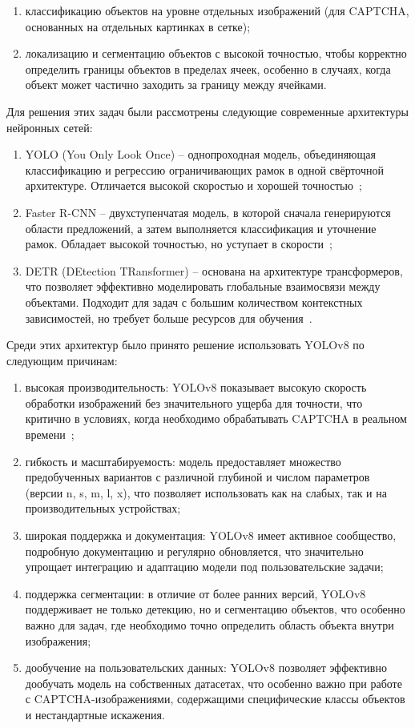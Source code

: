 \begin{enumerate}
    \item классификацию объектов на уровне отдельных изображений (для CAPTCHA, основанных на отдельных картинках в сетке);
    \item локализацию и сегментацию объектов с высокой точностью, чтобы корректно определить границы объектов в пределах ячеек, особенно в случаях, когда объект может частично заходить за границу между ячейками.
\end{enumerate}

Для решения этих задач были рассмотрены следующие современные архитектуры нейронных сетей:

\begin{enumerate}
    \item YOLO (You Only Look Once) -- однопроходная модель, объединяющая классификацию и регрессию ограничивающих рамок в одной свёрточной архитектуре. Отличается высокой скоростью и хорошей точностью~\cite{redmon2016yolov2, UltralyticsYOLOv8};
    \item Faster R-CNN -- двухступенчатая модель, в которой сначала генерируются области предложений, а затем выполняется классификация и уточнение рамок. Обладает высокой точностью, но уступает в скорости~\cite{ren2015fasterrcnn};
    \item DETR (DEtection TRansformer) -- основана на архитектуре трансформеров, что позволяет эффективно моделировать глобальные взаимосвязи между объектами. Подходит для задач с большим количеством контекстных зависимостей, но требует больше ресурсов для обучения~\cite{carion2020detr}.
\end{enumerate}

Среди этих архитектур было принято решение использовать YOLOv8 по следующим причинам:

\begin{enumerate}
    \item высокая производительность: YOLOv8 показывает высокую скорость обработки изображений без значительного ущерба для точности, что критично в условиях, когда необходимо обрабатывать CAPTCHA в реальном времени~\cite{bochkovskiy2020yolov4};
    \item гибкость и масштабируемость: модель предоставляет множество предобученных вариантов с различной глубиной и числом параметров (версии n, s, m, l, x), что позволяет использовать как на слабых, так и на производительных устройствах;
    \item широкая поддержка и документация: YOLOv8 имеет активное сообщество, подробную документацию и регулярно обновляется, что значительно упрощает интеграцию и адаптацию модели под пользовательские задачи;
    \item поддержка сегментации: в отличие от более ранних версий, YOLOv8 поддерживает не только детекцию, но и сегментацию объектов, что особенно важно для задач, где необходимо точно определить область объекта внутри изображения;
    \item дообучение на пользовательских данных: YOLOv8 позволяет эффективно дообучать модель на собственных датасетах, что особенно важно при работе с CAPTCHA-изображениями, содержащими специфические классы объектов и нестандартные искажения.
\end{enumerate}

